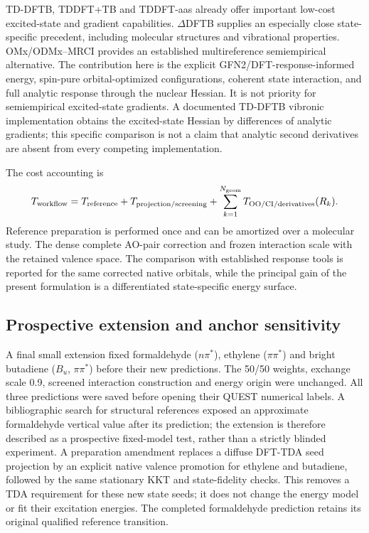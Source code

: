 \documentclass[11pt,a4paper]{article}
\begin{document}
TD-DFTB, TDDFT+TB and TDDFT-aas already offer important low-cost excited-state
and gradient capabilities.\cite{dftb2025,tbgrad2023,aas2024}
$\Delta$DFTB supplies an especially close state-specific precedent, including
molecular structures and vibrational properties.\cite{deltadftb2016}
OMx/ODMx--MRCI provides an established multireference semiempirical
alternative.\cite{omxexc2016,odmx2019} The contribution here is the explicit
GFN2/DFT-response-informed energy, spin-pure orbital-optimized configurations,
coherent state interaction, and full analytic response through the nuclear
Hessian. It is not priority for semiempirical excited-state gradients.
A documented TD-DFTB vibronic implementation obtains the excited-state
Hessian by differences of analytic gradients;\cite{tddftbvib2016} this
specific comparison is not a claim that analytic second derivatives are
absent from every competing implementation.

The cost accounting is
\begin{equation}
 T_{\rm workflow}=T_{\rm reference}+T_{\rm projection/screening}
 +\sum_{k=1}^{N_{\rm geom}}T_{\rm OO/CI/derivatives}(R_k).
\end{equation}
Reference preparation is performed once and can be amortized over a molecular
study. The dense complete AO-pair correction and frozen interaction scale with
the retained valence space. The comparison with established response tools is
reported for the same corrected native orbitals, while the principal gain of
the present formulation is a differentiated state-specific energy surface.

\subsection{Prospective extension and anchor sensitivity}
A final small extension fixed formaldehyde ($n\pi^*$), ethylene
($\pi\pi^*$) and bright butadiene ($B_u$, $\pi\pi^*$) before their new
predictions. The 50/50 weights, exchange scale 0.9, screened interaction
construction and energy origin were unchanged. All three predictions were
saved before opening their QUEST numerical labels. A bibliographic search
for structural references exposed an approximate formaldehyde vertical value
after its prediction; the extension is therefore described as a prospective
fixed-model test, rather than a strictly blinded experiment. A preparation
amendment replaces a diffuse DFT-TDA seed projection by an explicit native
valence promotion for ethylene and butadiene, followed by the same stationary
KKT and state-fidelity checks. This removes a TDA requirement for these new
state seeds; it does not change the energy model or fit their excitation
energies. The completed formaldehyde prediction retains its original
qualified reference transition.
\end{document}

